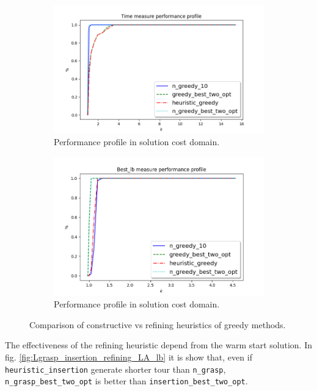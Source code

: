 \begin{figure}
	\centering
	\begin{subfigure}{.8\textwidth}
		\centering
		\includegraphics[width=\columnwidth]{../res/Lgreedy_refining_LA_time.png}
		\caption{Performance profile in solution cost domain.}
		\label{fig:Lgreedy_refining_LA_time}
	\end{subfigure}
	\begin{subfigure}{.8\textwidth}
		\centering
		\includegraphics[width=\columnwidth]{../res/Lgreedy_refining_LA_lb.png}
		\caption{Performance profile in solution cost domain.}
		\label{fig:Lgreedy_refining_LA_lb}
	\end{subfigure}
	\caption{Comparison of constructive vs refining heuristics of greedy methods.}
	\label{fig:pp_Lgreedy_refining}
\end{figure}


The effectiveness of the refining heuristic depend from the warm start solution. In fig. \ref{fig:Lgrasp_insertion_refining_LA_lb} it is show that, even if \texttt{heuristic\_insertion} generate shorter tour than \texttt{n\_grasp}, \texttt{n\_grasp\_best\_two\_opt} is better than \texttt{insertion\_best\_two\_opt}.

